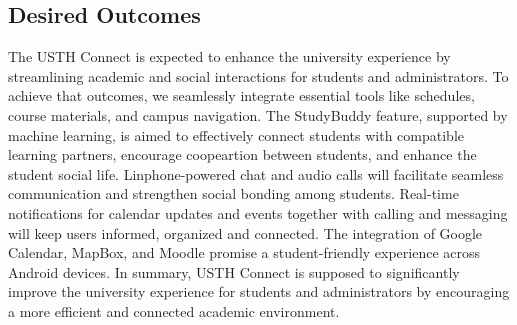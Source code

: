 \documentclass[12pt]{article}
\begin{document}
\subsection{Desired Outcomes}  
The USTH Connect is expected to enhance the university experience by streamlining academic and social interactions for students and administrators.
To achieve that outcomes, we seamlessly integrate essential tools like schedules, course materials, and campus navigation.
The StudyBuddy feature, supported by machine learning, is aimed to effectively connect students with compatible learning partners, encourage coopeartion between students, and enhance the student social life.
Linphone-powered chat and audio calls will facilitate seamless communication and strengthen social bonding among students.
Real-time notifications for calendar updates and events together with calling and messaging will keep users informed, organized and connected.
The integration of Google Calendar, MapBox, and Moodle promise a student-friendly experience across Android devices.
In summary, USTH Connect is supposed to significantly improve the university experience for students and administrators by encouraging a more efficient and connected academic environment.
\end{document}

